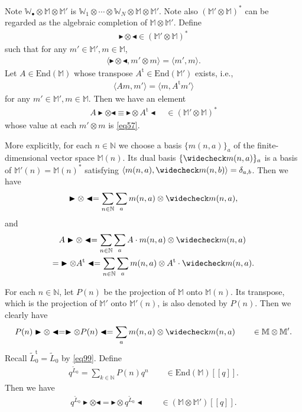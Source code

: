 \documentclass[11pt,b5paper,notitlepage]{article}
\theoremstyle{definition}
\theoremstyle{plain}
\newcommand{\wtd}{\widetilde}
\newcommand{\wch}{\widecheck}
\newcommand{\tr}{\mathrm{t}} %
\newcommand{\End}{\mathrm{End}} %
\newcommand{\bk}[1]{\langle {#1}\rangle}
\newcommand{\blt}{\bullet}
\newcommand{\Wbb}{\mathbb W}
\newcommand{\Mbb}{\mathbb M}
\newcommand{\Nbb}{\mathbb N}
\newcommand{\btl}{\blacktriangleleft}
\newcommand{\btr}{\blacktriangleright}
\numberwithin{equation}{section}
\begin{document}
Note $\Wbb_\blt\otimes\Mbb\otimes\Mbb'$ is $\Wbb_1\otimes\cdots\otimes \Wbb_N\otimes\Mbb\otimes\Mbb'$. Note also $(\Mbb'\otimes\Mbb)^*$ can be regarded as the algebraic completion of $\Mbb\otimes\Mbb'$.  Define \index{zzz@$\btr\otimes\btl$}
\begin{align*}
\btr\otimes\btl\in (\Mbb'\otimes\Mbb)^*
\end{align*}
such that for any $m'\in\Mbb',m\in\Mbb$,
\begin{align}
\bk{\btr\otimes\btl,m'\otimes m}=\bk{m',m}.\label{eq95}
\end{align}
Let $A\in\End(\Mbb)$ whose transpose $A^\tr\in\End(\Mbb')$ exists, i.e.,
\begin{align}
\bk{Am,m'}=\bk{m,A^\tr m'}\label{eq57}
\end{align}
for any $m'\in\Mbb',m\in\Mbb$. Then we have an element
\begin{align}
A\btr\otimes\btl\equiv \btr\otimes A^\tr\btl\quad\in (\Mbb'\otimes\Mbb)^*\label{eq58}
\end{align}
whose value at each $m'\otimes m$ is \eqref{eq57}.


More explicitly, for each $n\in\Nbb$ we choose a basis $\{m(n,a)\}_a$ of the finite-dimensional vector space $\Mbb(n)$. Its dual basis $\{\wch m(n,a)\}_a$ is a basis of $\Mbb'(n)=\Mbb(n)^*$ satisfying $\bk{m(n,a),\wch m(n,b)}=\delta_{a,b}$. Then we have
\begin{gather*}
\btr\otimes\btl=\sum_{n\in\Nbb}\sum_am(n,a)\otimes\wch m(n,a),
\end{gather*}
and
\begin{align*}
&A\btr\otimes\btl=\sum_{n\in\Nbb}\sum_a A\cdot m(n,a)\otimes\wch m(n,a)\\
=& \btr\otimes A^\tr\btl=\sum_{n\in\Nbb}\sum_am(n,a)\otimes A^\tr\cdot \wch m(n,a).
\end{align*}

For each $n\in\Nbb$, let $P(n)$ be the projection of $\Mbb$ onto $\Mbb(n)$.  Its transpose, which is the projection of $\Mbb'$ onto $\Mbb'(n)$, is also denoted by $P(n)$. Then we clearly have
\begin{align*}
P(n)\btr\otimes\btl=\btr\otimes P(n)\btl=\sum_am(n,a)\otimes\wch m(n,a)\qquad\in\Mbb\otimes\Mbb'.
\end{align*}
Recall $\wtd L_0^\tr=\wtd L_0$ by \eqref{eq99}. Define
\begin{align*}
q^{\wtd L_0}=\sum_{k\in\Nbb}P(n)q^n\qquad\in\End(\Mbb)[[q]].
\end{align*} 
Then we have
\begin{align}
q^{\wtd L_0}\btr\otimes\btl=\btr\otimes q^{\wtd L_0} \btl\qquad \in (\Mbb\otimes\Mbb')[[q]].\label{eq59}
\end{align}
\end{document}

